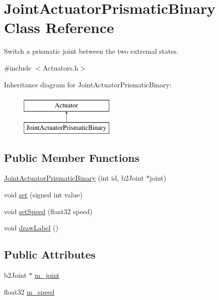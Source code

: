 \hypertarget{classJointActuatorPrismaticBinary}{\section{Joint\-Actuator\-Prismatic\-Binary Class Reference}
\label{classJointActuatorPrismaticBinary}
}


Switch a prismatic joint between the two extremal states.  




{\ttfamily \#include $<$Actuators.\-h$>$}

Inheritance diagram for Joint\-Actuator\-Prismatic\-Binary\-:\begin{figure}[H]
\begin{center}
\leavevmode
\includegraphics[height=2.000000cm]{classJointActuatorPrismaticBinary}
\end{center}
\end{figure}
\subsection*{Public Member Functions}
\begin{DoxyCompactItemize}
\item 
\hyperlink{classJointActuatorPrismaticBinary_aaaf871b53bc2e1c60088a9cd3a385949}{Joint\-Actuator\-Prismatic\-Binary} (int id, b2\-Joint $\ast$joint)
\item 
void \hyperlink{classJointActuatorPrismaticBinary_a78d1185c3762bb4301f31f0619cded7a}{set} (signed int value)
\item 
void \hyperlink{classJointActuatorPrismaticBinary_af5ea6bfc6b9e45d42b98d76d0a6c48ab}{set\-Speed} (float32 speed)
\item 
void \hyperlink{classJointActuatorPrismaticBinary_a2c4cd26a0ae47850eca1047ba078a654}{draw\-Label} ()
\end{DoxyCompactItemize}
\subsection*{Public Attributes}
\begin{DoxyCompactItemize}
\item 
b2\-Joint $\ast$ \hyperlink{classJointActuatorPrismaticBinary_acfe11f8fb117fa9257067367fcf9a8bc}{m\-\_\-joint}
\item 
float32 \hyperlink{classJointActuatorPrismaticBinary_aeeaabbbb710800d517ddfa34c7c68ded}{m\-\_\-speed}
\end{DoxyCompactItemize}


